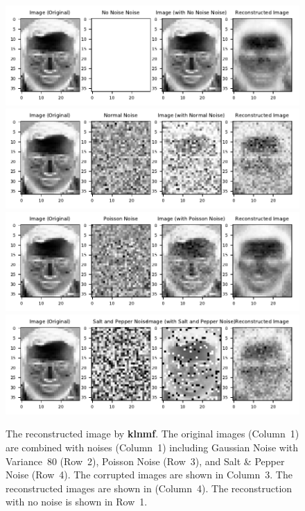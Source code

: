 \begin{figure}
	\centering
	\includegraphics[scale=.9]{Result_Multiplication_KL_Divergence_No_Noise_Comparison}\\
	\includegraphics[scale=.9]{Result_Multiplication_KL_Divergence_Normal_Comparison}\\
	\includegraphics[scale=.9]{Result_Multiplication_KL_Divergence_Poisson_Comparison}\\
	\includegraphics[scale=.9]{Result_Multiplication_KL_Divergence_Salt_and_Pepper_Comparison}
\caption{The reconstructed image by \textbf{klnmf}. The original images (Column~1) are combined with noises (Column~1) including Gaussian Noise with Variance~$80$ (Row~2), Poisson Noise (Row~3), and Salt \& Pepper Noise (Row~4). The corrupted images are shown in Column~3. The reconstructed images are shown in (Column~4). The reconstruction with no noise is shown in Row~1.}\label{noisesklnmff}
\end{figure}
